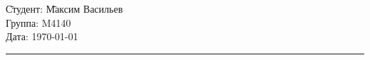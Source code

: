 \begin{tabbing}
\hspace{11cm} \= Студент: \= Максим Васильев \\
  \> Группа: \>  M4140 \\
  \> Дата: \> \today
\end{tabbing}
\hrule
\vspace{1cm}

